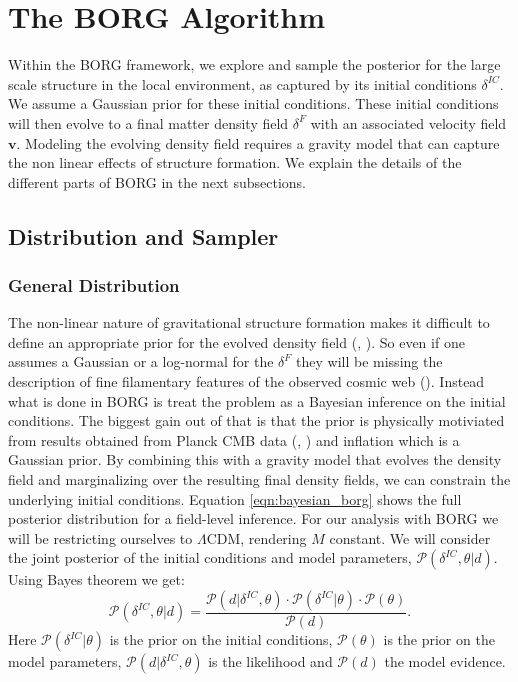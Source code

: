 \section{The BORG Algorithm} \label{sec:BORG}

Within the BORG framework, we explore and sample the posterior for the large scale structure in the local environment, as captured by its initial conditions $\delta^{IC}$. We assume a 
Gaussian prior for these initial conditions.  
These 
initial conditions will then evolve to a final matter density field $\delta^F$ with an associated velocity field $\mathbf{v}$.
Modeling the evolving density field requires a gravity model that 
can capture 
the non linear effects of structure formation. We explain the details of the different parts of BORG in the next subsections. \\
\subsection{Distribution and Sampler}

\subsubsection{General Distribution}
The non-linear nature of gravitational structure formation makes it difficult to define an appropriate prior for the evolved density field (\cite{Fisher_1995}, \cite{Jasche_2010}). 
So even if one assumes a Gaussian or a log-normal for the $\delta^F$ they will be missing the description of fine filamentary features of the observed cosmic web (\cite{Peebles_1980}). 
Instead what is done in BORG is treat the problem as a Bayesian inference on the initial conditions. The biggest gain out of that is that the prior is physically 
motiviated from results obtained from Planck CMB data (\cite{Planck_2016}, \cite{Planck_2018}) and inflation which is a Gaussian prior. 
By combining this with a gravity model that evolves the density field and marginalizing over the resulting final density fields, we can constrain the underlying initial conditions. 
Equation \ref{eqn:bayesian_borg} shows the full posterior distribution for a field-level inference. For our analysis with BORG we will be restricting ourselves to $\Lambda$CDM, 
rendering $M$ constant. We will consider the joint posterior of the initial conditions and model 
parameters, $\mathcal{P}(\delta^{IC},\theta | d)$. Using Bayes theorem we get: 
\begin{equation}
    \mathcal{P}(\delta^{IC},\theta | d) =
    \frac{
        \mathcal{P}(d | \delta^{IC},\theta)
        \cdot
        \mathcal{P}(\delta^{IC} | \theta)
        \cdot
        \mathcal{P}(\theta)
    }{
        \mathcal{P}(d)
    }.
\end{equation}
Here $\mathcal{P}(\delta^{IC} | \theta)$ is the prior on the initial 
conditions, $\mathcal{P}(\theta)$ is the prior on the model parameters, 
$\mathcal{P}(d | \delta^{IC},\theta)$ is the likelihood and 
$\mathcal{P}(d)$ the model evidence. 

